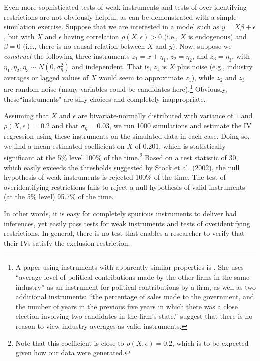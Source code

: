 \documentclass[11pt,reqno]{amsart}
\begin{document}
\begin{doublespace}
Even more sophisticated tests of weak instruments and tests of over-identifying restrictions are not obviously helpful, as can be demonstrated with a simple simulation exercise.
Suppose that we are interested in a model such as $y = X \beta + \epsilon$, but with $X$ and $\epsilon$ having correlation $\rho(X, \epsilon) > 0$ (i.e., $X$ is endogenous) and $\beta = 0$ (i.e., there is no causal relation between $X$ and $y$). 
Now, suppose we \emph{construct} the following three instruments 
$z_1 = x +\eta_1$, $z_2 = \eta_2$, and $z_3 = \eta_3$, with $\eta_1, \eta_2,  \eta_3 \sim N(0, \sigma_{\eta}^2)$ and independent. 
That is, $z_1$ is $X$ plus noise (e.g., industry averages or lagged values of $X$ would seem to approximate $z_1$), while $z_2$ and $z_3$ are random noise (many variables could be candidates here).\footnote{A paper using instruments with apparently similar properties is \citet{Correia:2014fp}. 
She uses ``average level of political contributions made by the other firms in the same industry'' as an instrument for political contributions by a firm, as well as two additional instruments: ``the percentage of sales made to the government, and the number of years in the previous five years in which there was a close election involving two candidates in the firm's state.''  \citet{Reiss:2007ej} suggest that there is no reason to view industry averages as valid instruments.}
Obviously, these``instruments" are silly choices and completely inappropriate.

Assuming that $X$ and $\epsilon$ are bivariate-normally distributed with variance of $1$ and $\rho(X, \epsilon)=0.2$ and that $\sigma_{\eta}=0.03$, we run 1000 simulations and  estimate the IV regression using these instruments on the simulated data in each case.
Doing so, we find a mean estimated coefficient on $X$ of $0.201$, which is statistically significant at the 5\% level 100\% of the time.\footnote{Note that this coefficient is close to $\rho(X, \epsilon) = 0.2$, which is to be expected given how our data were generated.} Based on a test statistic of 30, which easily exceeds the thresholds suggested by Stock et al. (2002), the null hypothesis of weak instruments is rejected 100\% of the time. 
The test of overidentifying restrictions fails to reject a null hypothesis of valid instruments (at the 5\% level) 95.7\% of the time.

In other words, it is easy for completely spurious instruments to deliver bad inferences, yet easily pass tests for weak instruments and tests of overidentifying restrictions.
In general, there is no test that enables a researcher to verify that their IVs satisfy the exclusion restriction.


\end{doublespace}
\end{document}
